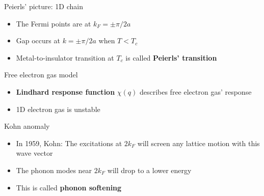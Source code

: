 \documentclass{beamer}
\begin{document}
\begin{frame}{Peierls' picture: 1D chain}
\begin{itemize}
\item The Fermi points are at $k_F = \pm \pi / 2 a$ %
\item Gap occurs at $k = \pm \pi / 2 a$ when $T < T_c$
\item Metal-to-insulator transition at $T_c$ is called \textbf{Peierls' transition}
\end{itemize}
\end{frame}

\begin{frame}{Free electron gas model}
\begin{itemize}
\item \textbf{Lindhard response function} $\chi(q)$ describes free electron gas' response
\item 1D electron gas is unstable
\end{itemize}
\end{frame}

\begin{frame}{Kohn anomaly}
\begin{itemize}
\item In 1959, Kohn: The excitations at $2 k_F$ will screen any lattice motion with this wave vector
\item The phonon modes near $2 k_F$ will drop to a lower energy
\item This is called \textbf{phonon softening}
\end{itemize}
\end{frame}
\end{document}
